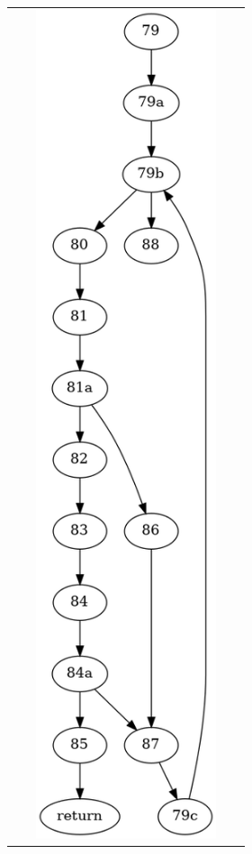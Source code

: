 \documentclass[12pts]{report}
\begin{document}
\begin{figure}
\begin{tabular}{c @{} c @{} c}
\begin{minipage}{0.3\textwidth}
\begin{center}
\end{center}
\end{minipage}
&
\begin{minipage}{0.3\textwidth}
\begin{center}
\includegraphics[width=0.9\textwidth]{images/singleStep-cfg2.png}

\end{center}
\end{minipage}
\end{tabular}
\end{figure}
\end{document}
